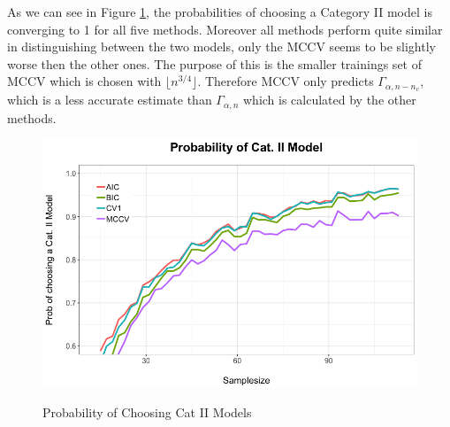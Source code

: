 \documentclass[Research_Module_ES.tex]{subfiles}
\begin{document}
As we can see in Figure \ref{Simulation1}, the probabilities of choosing a Category II model is converging to 1 for all five methods. Moreover all methods perform quite similar in distinguishing between the two models, only the MCCV seems to be slightly worse then the other ones. The purpose of this is the smaller trainings set of MCCV which is chosen with $\lfloor n^{3/4}\rfloor$. Therefore MCCV only predicts $\Gamma_{\alpha,n-n_v}$, which is a less accurate estimate than $\Gamma_{\alpha,n}$ which is calculated by the other methods. 
\begin{figure}[h]
	\label{Simulation1}
	\centering
	\includegraphics[width=1\textwidth]{Simulation1.png}\\
\caption{Probability of Choosing Cat II Models}
\end{figure}
\end{document}

